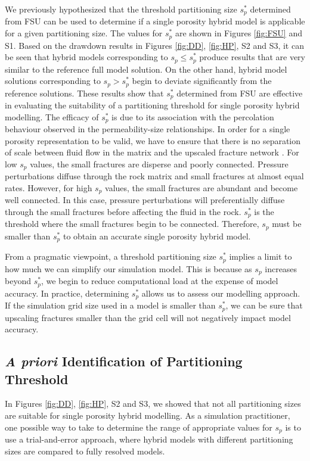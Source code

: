 \documentclass[draft]{agujournal2018}
\begin{document}
We previously hypothesized that the threshold partitioning size $s_p^*$ determined from FSU can be used to determine if a single porosity hybrid model is applicable for a given partitioning size. The values for $s_p^*$ are shown in Figures \ref{fig:FSU} and S1. Based on the drawdown results in Figures \ref{fig:DD}, \ref{fig:HP}, S2 and S3, it can be seen that hybrid models corresponding to $s_p \leq s_p^*$ produce results that are very similar to the reference full model solution. On the other hand, hybrid model solutions corresponding to $s_p > s_p^*$ begin to deviate significantly from the reference solutions. These results show that $s_p^*$ determined from FSU are effective in evaluating the suitability of a partitioning threshold for single porosity hybrid modelling. The efficacy of $s_p^*$ is due to its association with the percolation behaviour observed in the permeability-size relationships. In order for a single porosity representation to be valid, we have to ensure that there is no separation of scale between fluid flow in the matrix and the upscaled fracture network \citep{Matthai2004a}. For low $s_p$ values, the small fractures are disperse and poorly connected. Pressure perturbations diffuse through the rock matrix and small fractures at almost equal rates. However, for high $s_p$ values, the small fractures are abundant and become well connected. In this case, pressure perturbations will preferentially diffuse through the small fractures before affecting the fluid in the rock. $s_p^*$ is the threshold where the small fractures begin to be connected. Therefore, $s_p$ must be smaller than $s_p^*$ to obtain an accurate single porosity hybrid model.

From a pragmatic viewpoint, a threshold partitioning size $s_p^*$ implies a limit to how much we can simplify our simulation model. This is because as $s_p$ increases beyond $s_p^*$, we begin to reduce computational load at the expense of model accuracy. In practice, determining $s_p^*$ allows us to assess our modelling approach. If the simulation grid size used in a model is smaller than $s_p^*$, we can be sure that upscaling fractures smaller than the grid cell will not negatively impact model accuracy.

\subsection{\textit{A priori} Identification of Partitioning Threshold}
In Figures \ref{fig:DD}, \ref{fig:HP}, S2 and S3, we showed that not all partitioning sizes are suitable for single porosity hybrid modelling. As a simulation practitioner, one possible way to take to determine the range of appropriate values for $s_p$ is to use a trial-and-error approach, where hybrid models with different partitioning sizes are compared to fully resolved models. 
\end{document}
